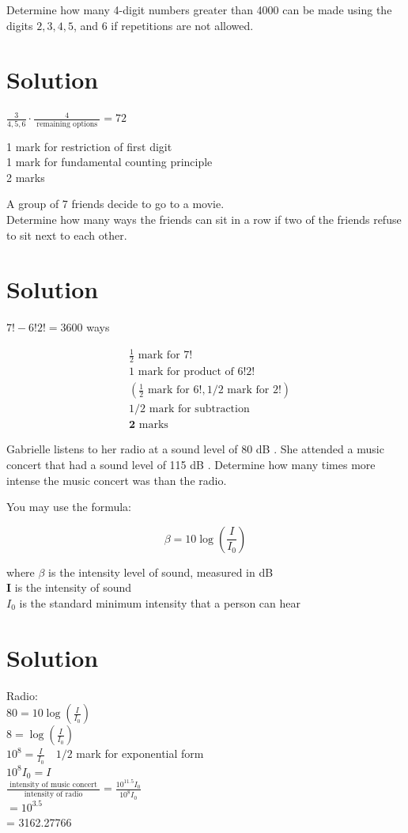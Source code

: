 \documentclass[10pt]{article}
\begin{document}
Determine how many 4-digit numbers greater than 4000 can be made using the digits $2,3,4,5$, and 6 if repetitions are not allowed.

\section*{Solution}
$\frac{3}{4,5,6} \cdot \frac{4}{\text { remaining options }}=72$

1 mark for restriction of first digit\\
1 mark for fundamental counting principle\\
2 marks

A group of 7 friends decide to go to a movie.\\
Determine how many ways the friends can sit in a row if two of the friends refuse to sit next to each other.

\section*{Solution}
$7!-6!2!=3600$ ways

$$
\begin{aligned}
& \frac{1}{2} \text { mark for } 7! \\
& 1 \text { mark for product of } 6!2! \\
& \left(\frac{1}{2} \text { mark for } 6!, 1 / 2 \text { mark for } 2!\right) \\
& 1 / 2 \text { mark for subtraction } \\
& \mathbf{2} \text { marks }
\end{aligned}
$$

Gabrielle listens to her radio at a sound level of 80 dB . She attended a music concert that had a sound level of 115 dB . Determine how many times more intense the music concert was than the radio.

You may use the formula:

$$
\beta=10 \log \left(\frac{I}{I_{0}}\right)
$$

where $\beta$ is the intensity level of sound, measured in dB\\
$\boldsymbol{I}$ is the intensity of sound\\
$I_{0}$ is the standard minimum intensity that a person can hear

\section*{Solution}
Radio:\\
$80=10 \log \left(\frac{I}{I_{0}}\right)$\\
$8=\log \left(\frac{I}{I_{0}}\right)$\\
$10^{8}=\frac{I}{I_{0}} \quad 1 / 2$ mark for exponential form\\
$10^{8} I_{0}=I$\\
$\frac{\text { intensity of music concert }}{\text { intensity of radio }}=\frac{10^{11.5} I_{0}}{10^{8} I_{0}}$\\
$=10^{3.5}$\\
= 3162.27766
\end{document}
